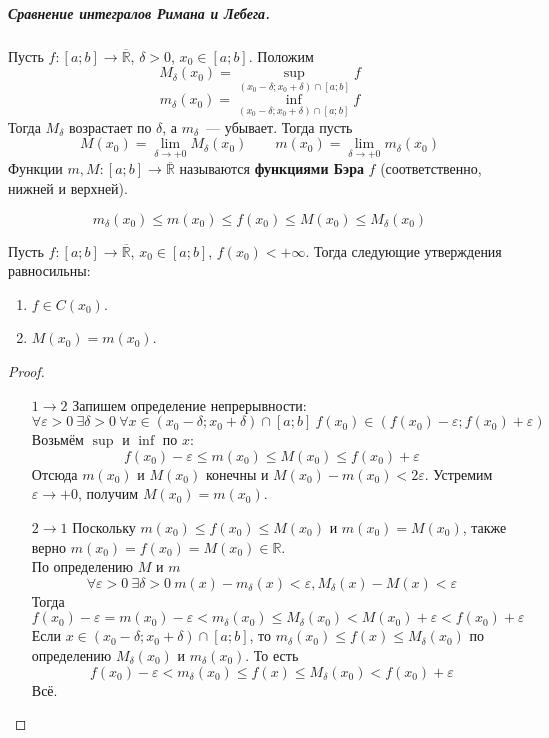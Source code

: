 \documentclass{article}
\let\eps\varepsilon
\begin{document}
    \subparagraph{Сравнение интегралов Римана и Лебега.}
    \begin{definition}
        Пусть $f\colon[a;b]\to\overline{\mathbb R}$, $\delta>0$, $x_0\in[a;b]$. Положим
        $$
        M_\delta(x_0)=\sup\limits_{(x_0-\delta;x_0+\delta)\cap[a;b]}f
        $$
        $$
        m_\delta(x_0)=\inf\limits_{(x_0-\delta;x_0+\delta)\cap[a;b]}f
        $$
        Тогда $M_\delta$ возрастает по $\delta$, а $m_\delta$~--- убывает. Тогда пусть
        $$
        M(x_0)=\lim\limits_{\delta\to+0}M_\delta(x_0)\qquad m(x_0)=\lim\limits_{\delta\to+0}m_\delta(x_0)
        $$
        Функции $m,M\colon[a;b]\to\overline{\mathbb R}$ называются \textbf{функциями Бэра} $f$ (соответственно, нижней и верхней).
    \end{definition}
    \begin{property}
        $$m_\delta(x_0)\leqslant m(x_0)\leqslant f(x_0)\leqslant M(x_0)\leqslant M_\delta(x_0)$$
    \end{property}
    \begin{theorem}
        \label{Теорема Бэра}
        Пусть $f\colon [a;b]\to\overline{\mathbb R}$, $x_0\in[a;b]$, $f(x_0)<+\infty$. Тогда следующие утверждения равносильны:
        \begin{enumerate}
            \item $f\in C(x_0)$.
            \item $M(x_0)=m(x_0)$.
        \end{enumerate}
    \end{theorem}
    \begin{proof}
        \begin{enumerate}
            \item[$1\to2$] Запишем определение непрерывности:
            $$
            \forall\eps>0~\exists\delta>0~\forall x\in(x_0-\delta;x_0+\delta)\cap[a;b]~f(x_0)\in(f(x_0)-\eps;f(x_0)+\eps)
            $$
            Возьмём $\sup$ и $\inf$ по $x$:
            $$
            f(x_0)-\eps\leqslant m(x_0)\leqslant M(x_0)\leqslant f(x_0)+\eps
            $$
            Отсюда $m(x_0)$ и $M(x_0)$ конечны и $M(x_0)-m(x_0)<2\eps$. Устремим $\eps\to+0$, получим $M(x_0)=m(x_0)$.
            \item[$2\to1$] Поскольку $m(x_0)\leqslant f(x_0)\leqslant M(x_0)$ и $m(x_0)=M(x_0)$, также верно $m(x_0)=f(x_0)=M(x_0)\in\mathbb R$.\\
            По определению $M$ и $m$
            $$
            \forall\eps>0~\exists\delta>0~m(x)-m_\delta(x)<\eps,M_\delta(x)-M(x)<\eps
            $$
            Тогда
            $$
            f(x_0)-\eps=m(x_0)-\eps<m_\delta(x_0)\leqslant M_\delta(x_0)<M(x_0)+\eps<f(x_0)+\eps
            $$
            Если $x\in(x_0-\delta;x_0+\delta)\cap[a;b]$, то $m_\delta(x_0)\leqslant f(x)\leqslant M_\delta(x_0)$ по определению $M_\delta(x_0)$ и $m_\delta(x_0)$. То есть
            $$
            f(x_0)-\eps<m_\delta(x_0)\leqslant f(x)\leqslant M_\delta(x_0)<f(x_0)+\eps
            $$
            Всё.
        \end{enumerate}
    \end{proof}
\end{document}
